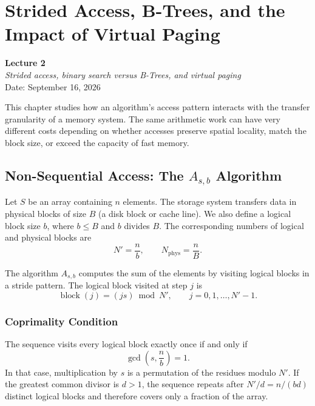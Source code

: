 \chapter{Strided Access, B-Trees, and the Impact of Virtual Paging}
\label{cha:lecture-two}

\begin{center}
  \textbf{Lecture 2}\\
  \emph{Strided access, binary search versus B-Trees, and virtual paging}\\[0.5em]
  Date: September 16, 2026
\end{center}

This chapter studies how an algorithm's access pattern interacts with the
transfer granularity of a memory system. The same arithmetic work can have
very different costs depending on whether accesses preserve spatial locality,
match the block size, or exceed the capacity of fast memory.

\section{Non-Sequential Access: The \texorpdfstring{$A_{s,b}$}{A-s-b} Algorithm}
\label{sec:strided-access}

Let $S$ be an array containing $n$ elements. The storage system transfers data
in physical blocks of size $B$ (a disk block or cache line). We also define a
logical block size $b$, where $b \leq B$ and $b$ divides $B$. The corresponding
numbers of logical and physical blocks are
\[
  N' = \frac{n}{b},
  \qquad
  N_{\mathrm{phys}} = \frac{n}{B}.
\]

The algorithm $A_{s,b}$ computes the sum of the elements by visiting logical
blocks in a stride pattern. The logical block visited at step $j$ is
\[
  \operatorname{block}(j) = (j s) \bmod N',
  \qquad j = 0,1,\ldots,N'-1.
\]

\subsection{Coprimality Condition}
\label{subsec:coprimality}

The sequence visits every logical block exactly once if and only if
\[
  \gcd\!\left(s,\frac{n}{b}\right)=1.
\]
In that case, multiplication by $s$ is a permutation of the residues modulo
$N'$. If the greatest common divisor is $d>1$, the sequence repeats after
$N'/d = n/(bd)$ distinct logical blocks and therefore covers only a fraction
of the array.

